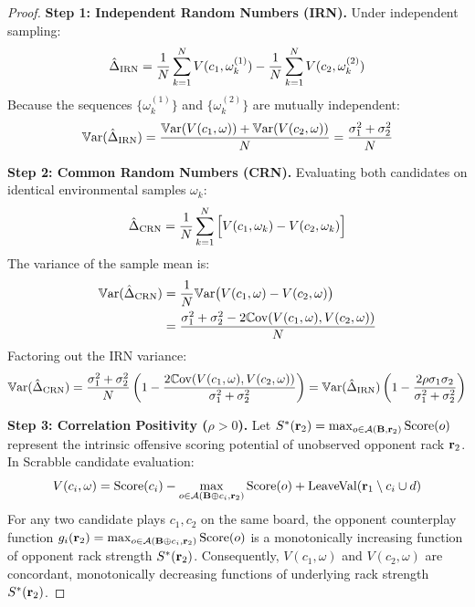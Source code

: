 \begin{proof}
\textbf{Step 1: Independent Random Numbers (IRN).}
Under independent sampling:
\begin{equation}
    \hat{\Delta}_{\mathrm{IRN}} = \frac{1}{N} \sum_{k=1}^N V(c_1, \omega^{(1)}_k) - \frac{1}{N} \sum_{k=1}^N V(c_2, \omega^{(2)}_k)
\end{equation}
Because the sequences $\{\omega^{(1)}_k\}$ and $\{\omega^{(2)}_k\}$ are mutually independent:
\begin{equation}
    \mathbb{V}\mathrm{ar}(\hat{\Delta}_{\mathrm{IRN}}) = \frac{\mathbb{V}\mathrm{ar}(V(c_1, \omega)) + \mathbb{V}\mathrm{ar}(V(c_2, \omega))}{N} = \frac{\sigma_1^2 + \sigma_2^2}{N}
\end{equation}

\textbf{Step 2: Common Random Numbers (CRN).}
Evaluating both candidates on identical environmental samples $\omega_k$:
\begin{equation}
    \hat{\Delta}_{\mathrm{CRN}} = \frac{1}{N} \sum_{k=1}^N \Big[ V(c_1, \omega_k) - V(c_2, \omega_k) \Big]
\end{equation}
The variance of the sample mean is:
\begin{align}
    \mathbb{V}\mathrm{ar}(\hat{\Delta}_{\mathrm{CRN}}) &= \frac{1}{N} \mathbb{V}\mathrm{ar}\big( V(c_1, \omega) - V(c_2, \omega) \big) \nonumber \\
    &= \frac{\sigma_1^2 + \sigma_2^2 - 2 \mathbb{C}\mathrm{ov}(V(c_1, \omega), V(c_2, \omega))}{N}
\end{align}
Factoring out the IRN variance:
\begin{equation}
    \mathbb{V}\mathrm{ar}(\hat{\Delta}_{\mathrm{CRN}}) = \frac{\sigma_1^2 + \sigma_2^2}{N} \left( 1 - \frac{2 \mathbb{C}\mathrm{ov}(V(c_1, \omega), V(c_2, \omega))}{\sigma_1^2 + \sigma_2^2} \right) = \mathbb{V}\mathrm{ar}(\hat{\Delta}_{\mathrm{IRN}}) \left( 1 - \frac{2 \rho \sigma_1 \sigma_2}{\sigma_1^2 + \sigma_2^2} \right)
\end{equation}

\textbf{Step 3: Correlation Positivity ($\rho > 0$).}
Let $S^*(\mathbf{r}_2) = \max_{o \in \mathcal{A}(\mathbf{B}, \mathbf{r}_2)} \mathrm{Score}(o)$ represent the intrinsic offensive scoring potential of unobserved opponent rack $\mathbf{r}_2$. In Scrabble candidate evaluation:
\begin{equation}
    V(c_i, \omega) = \mathrm{Score}(c_i) - \max_{o \in \mathcal{A}(\mathbf{B} \oplus c_i, \mathbf{r}_2)} \mathrm{Score}(o) + \mathrm{LeaveVal}(\mathbf{r}_1 \setminus c_i \cup d)
\end{equation}
For any two candidate plays $c_1, c_2$ on the same board, the opponent counterplay function $g_i(\mathbf{r}_2) = \max_{o \in \mathcal{A}(\mathbf{B} \oplus c_i, \mathbf{r}_2)} \mathrm{Score}(o)$ is a monotonically increasing function of opponent rack strength $S^*(\mathbf{r}_2)$. Consequently, $V(c_1, \omega)$ and $V(c_2, \omega)$ are concordant, monotonically decreasing functions of underlying rack strength $S^*(\mathbf{r}_2)$.


\end{proof}
